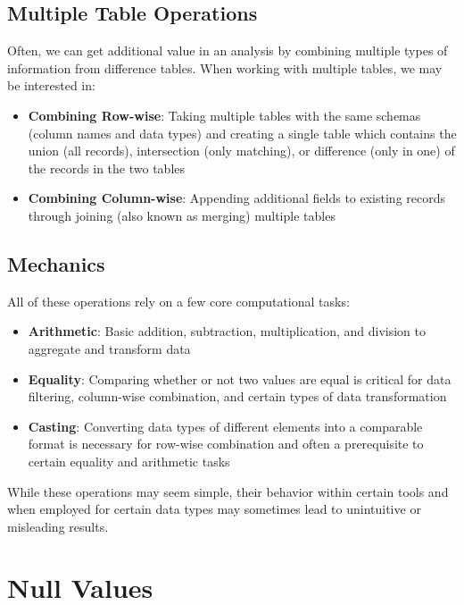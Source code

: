 \documentclass[
]{krantz}
\providecommand{\tightlist}{%
  \setlength{\itemsep}{0pt}\setlength{\parskip}{0pt}}
\begin{document}
\hypertarget{multiple-table-operations}{%
\subsection{Multiple Table Operations}\label{multiple-table-operations}}

Often, we can get additional value in an analysis by combining multiple types of information from difference tables.
When working with multiple tables, we may be interested in:

\begin{itemize}
\tightlist
\item
  \textbf{Combining Row-wise}: Taking multiple tables with the same schemas (column names and data types) and creating a single table which contains the union (all records), intersection (only matching), or difference (only in one) of the records in the two tables
\item
  \textbf{Combining Column-wise}: Appending additional fields to existing records through joining (also known as merging) multiple tables
\end{itemize}

\hypertarget{mechanics}{%
\subsection{Mechanics}\label{mechanics}}

All of these operations rely on a few core computational tasks:

\begin{itemize}
\tightlist
\item
  \textbf{Arithmetic}: Basic addition, subtraction, multiplication, and division to aggregate and transform data
\item
  \textbf{Equality}: Comparing whether or not two values are equal is critical for data filtering, column-wise combination, and certain types of data transformation
\item
  \textbf{Casting}: Converting data types of different elements into a comparable format is necessary for row-wise combination and often a prerequisite to certain equality and arithmetic tasks
\end{itemize}

While these operations may seem simple, their behavior within certain tools and when employed for certain data types may sometimes lead to unintuitive or misleading results.

\hypertarget{null-values}{%
\section{Null Values}\label{null-values}}
\end{document}
